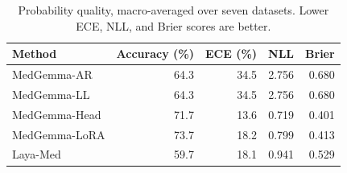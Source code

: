 \begin{table}[t]
\centering\small
\setlength{\tabcolsep}{5pt}
\begin{tabular}{lrrrr}
\toprule
Method & Accuracy (\%) & ECE (\%) & NLL & Brier \\
\midrule
MedGemma-AR & 64.3 & 34.5 & 2.756 & 0.680 \\
MedGemma-LL & 64.3 & 34.5 & 2.756 & 0.680 \\
MedGemma-Head & 71.7 & 13.6 & 0.719 & 0.401 \\
MedGemma-LoRA & 73.7 & 18.2 & 0.799 & 0.413 \\
Laya-Med & 59.7 & 18.1 & 0.941 & 0.529 \\

\bottomrule
\end{tabular}
\caption{Probability quality, macro-averaged over seven datasets. Lower ECE, NLL, and Brier scores are better.}
\label{tab:updated_probability}
\end{table}
